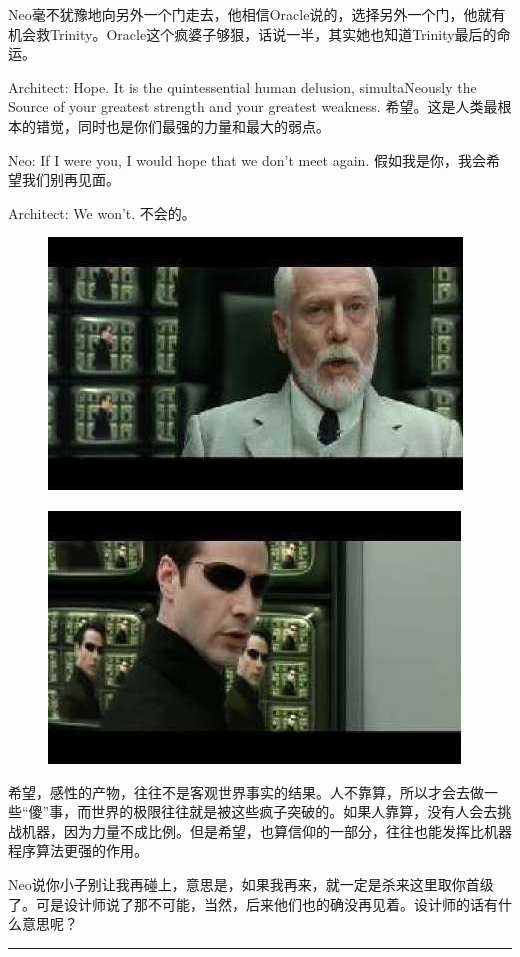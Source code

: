 \documentclass[UTF8]{ctexart}
\newcommand{\myparsep}{\noindent \rule[0.5ex]{\linewidth}{1pt}}
\begin{document}
Neo毫不犹豫地向另外一个门走去，他相信Oracle说的，选择另外一个门，他就有机会救Trinity。Oracle这个疯婆子够狠，话说一半，其实她也知道Trinity最后的命运。

Architect: Hope. It is the quintessential human delusion, simultaNeously the Source of your greatest strength and your greatest weakness. 希望。这是人类最根本的错觉，同时也是你们最强的力量和最大的弱点。

Neo: If I were you, I would hope that we don't meet again. 假如我是你，我会希望我们别再见面。

Architect: We won't. 不会的。

\begin{figure}[htb]
\centering
\includegraphics[width=0.5\linewidth]{fig/read_reloaded-169}
\end{figure}

\begin{figure}[htb]
\centering
\includegraphics[width=0.5\linewidth]{fig/read_reloaded-169-1}
\end{figure}

希望，感性的产物，往往不是客观世界事实的结果。人不靠算，所以才会去做一些“傻”事，而世界的极限往往就是被这些疯子突破的。如果人靠算，没有人会去挑战机器，因为力量不成比例。但是希望，也算信仰的一部分，往往也能发挥比机器程序算法更强的作用。

Neo说你小子别让我再碰上，意思是，如果我再来，就一定是杀来这里取你首级了。可是设计师说了那不可能，当然，后来他们也的确没再见着。设计师的话有什么意思呢？

\myparsep
\end{document}
